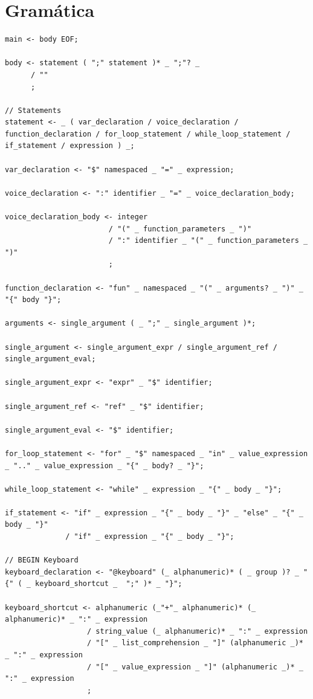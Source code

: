 \documentclass[
  oneside,
  11pt, a4paper,
  footinclude=true,
  headinclude=true,
  cleardoublepage=empty
]{scrbook}
\begin{document}
	\section{Gramática}
	\label{grammar}
	\begin{lstlisting}
main <- body EOF;

body <- statement ( ";" statement )* _ ";"? _
      / ""
      ;

// Statements
statement <- _ ( var_declaration / voice_declaration / function_declaration / for_loop_statement / while_loop_statement / if_statement / expression ) _;

var_declaration <- "$" namespaced _ "=" _ expression;

voice_declaration <- ":" identifier _ "=" _ voice_declaration_body;

voice_declaration_body <- integer
                        / "(" _ function_parameters _ ")"
                        / ":" identifier _ "(" _ function_parameters _ ")"
                        ;

function_declaration <- "fun" _ namespaced _ "(" _ arguments? _ ")" _ "{" body "}";

arguments <- single_argument ( _ ";" _ single_argument )*;

single_argument <- single_argument_expr / single_argument_ref / single_argument_eval;

single_argument_expr <- "expr" _ "$" identifier;

single_argument_ref <- "ref" _ "$" identifier;

single_argument_eval <- "$" identifier;

for_loop_statement <- "for" _ "$" namespaced _ "in" _ value_expression _ ".." _ value_expression _ "{" _ body? _ "}";

while_loop_statement <- "while" _ expression _ "{" _ body _ "}";

if_statement <- "if" _ expression _ "{" _ body _ "}" _ "else" _ "{" _ body _ "}"
              / "if" _ expression _ "{" _ body _ "}";

// BEGIN Keyboard
keyboard_declaration <- "@keyboard" (_ alphanumeric)* ( _ group )? _ "{" ( _ keyboard_shortcut _  ";" )* _ "}";

keyboard_shortcut <- alphanumeric (_"+"_ alphanumeric)* (_ alphanumeric)* _ ":" _ expression
                   / string_value (_ alphanumeric)* _ ":" _ expression
                   / "[" _ list_comprehension _ "]" (alphanumeric _)* _ ":" _ expression
                   / "[" _ value_expression _ "]" (alphanumeric _)* _ ":" _ expression
                   ;


\end{lstlisting}
\end{document}
